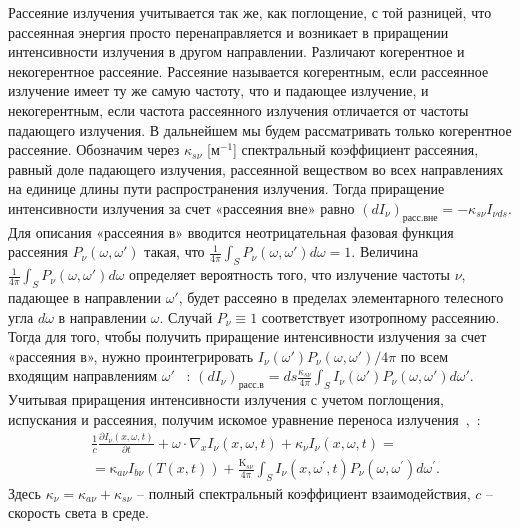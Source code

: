Рассеяние излучения учитывается так же, как поглощение, с той разницей,
что рассеянная энергия просто перенаправляется и возникает в приращении
интенсивности излучения в другом направлении.
Различают когерентное и некогерентное рассеяние.
Рассеяние называется когерентным, если рассеянное излучение имеет ту же самую частоту,
что и падающее излучение, и некогерентным, если частота рассеянного
излучения отличается от частоты падающего излучения.
В дальнейшем мы будем рассматривать только когерентное рассеяние.
Обозначим через $\kappa_{s\nu}$ [$\text{м}^{-1}$] спектральный коэффициент рассеяния, равный
доле падающего излучения, рассеянной веществом во всех направлениях на
единице длины пути распространения излучения.
Тогда приращение интенсивности излучения за счет «рассеяния вне» равно
$(dI_{\nu})_\text{расс.вне} = - \kappa_{s\nu}I_{\nu ds}$.
Для описания «рассеяния в» вводится неотрицательная фазовая функция рассеяния
$P_{\nu}(\omega, \omega')$ такая, что $\frac{1}{4\pi}\int_S P_{\nu} (\omega, \omega')d\omega = 1$.
Величина $\frac{1}{4\pi}\int_S P_{\nu} (\omega, \omega')d\omega$
определяет вероятность того, что излучение частоты $\nu$,
падающее в направлении $\omega'$,
будет рассеяно в пределах элементарного телесного угла $d\omega$ в направлении $\omega$.
Случай $P_\nu \equiv 1$ соответствует изотропному рассеянию.
Тогда для того, чтобы получить приращение интенсивности излучения за счет «рассеяния в», нужно
проинтегрировать $I_\nu(\omega')P_\nu(\omega,\omega')/4\pi$ по всем входящим направлениям
$\omega'$ ~\cite[283]{modest2013radiative}:
$(dI_\nu)_\text{расс.в} = ds \frac{\kappa_{s\nu}}{4\pi}\int_S I_\nu(\omega')P_{\nu}(\omega,\omega')d\omega'$.
Учитывая приращения интенсивности излучения с учетом поглощения,
испускания и рассеяния, получим
искомое уравнение переноса излучения~\cite[272]{Ozisik1976},~\cite[284]{modest2013radiative}:
\begin{equation}
    \label{eq:1_1:1}
    \begin{aligned}
        &\frac{1}{c} \frac{\partial I_\nu(x, \omega, t)}
        {\partial t}+\omega \cdot \nabla_x I_\nu(x, \omega, t)+\kappa_\nu I_\nu(x, \omega, t)=\\
        &=\mathrm{\kappa}_{a \nu} I_{b \nu}(T(x, t))+\frac{\mathrm{K}_{s \nu}}{4 \pi}
        \int_S I_\nu\left(x, \omega^{\prime}, t\right)
        P_\nu\left(\omega, \omega^{\prime}\right) d \omega^{\prime}.
    \end{aligned}
\end{equation}
Здесь $\kappa_{\nu} = \kappa_{a\nu} + \kappa_{s\nu}$ -- полный
спектральный коэффициент взаимодействия,
$c$ -- скорость света в среде.



